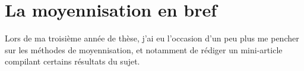 
\clearemptydoublepage
\chapter{La moyennisation en bref}
\label{chap:avg}

Lors de ma troisième année de thèse, j'ai eu l'occasion d'un peu plus me
pencher sur les méthodes de moyennisation, et notamment de rédiger un
mini-article compilant certains résultats du sujet. 
















